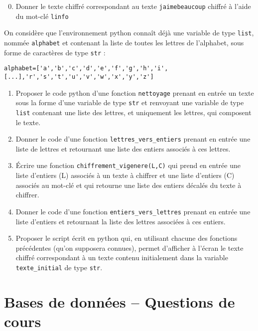 \begin{enumerate}
\setcounter{enumi}{-1}
 \item Donner le texte chiffré correspondant au texte \verb|jaimebeaucoup| chiffré à l'aide du mot-clé \verb|linfo|
\end{enumerate}

On considère que l'environnement python connaît déjà une variable de type \verb|list|, nommée \verb|alphabet| et contenant la liste de toutes les lettres de l'alphabet, sous forme de caractères de type \verb|str| :

\verb|alphabet=['a','b','c','d','e','f','g','h','i',[...],'r','s','t','u','v','w','x','y','z']|

\begin{enumerate}
\item Proposer le code python d'une fonction \verb|nettoyage| prenant en entrée un texte sous la forme d'une variable de type \verb|str| et renvoyant une variable de type \verb|list| contenant une liste des lettres, et uniquement les lettres, qui composent le texte. 

\item Donner le code d'une fonction \verb|lettres_vers_entiers| prenant en entrée une liste de lettres et retournant une liste des entiers associés à ces lettres.

\item Écrire une fonction \verb|chiffrement_vigenere(L,C)| qui prend en entrée une liste d'entiers (L) associés à un texte à chiffrer et une liste d'entiers (C) associés au mot-clé et qui retourne une liste des entiers décalés du texte à chiffrer.

\item Donner le code d'une fonction \verb|entiers_vers_lettres| prenant en entrée une liste d'entiers et retournant la liste des lettres associées à ces entiers.

\item Proposer le script écrit en python qui, en utilisant chacune des fonctions précédentes (qu'on supposera connues), permet d'afficher à l'écran le texte chiffré correspondant à un texte contenu initialement dans la variable \verb|texte_initial| de type \verb|str|.
\end{enumerate}

\section{Bases de données -- Questions de cours}

